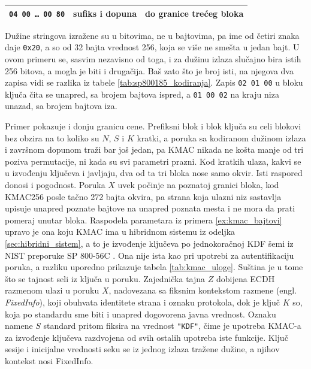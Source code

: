 \begin{example}
\begin{center}
\begin{tabular}{|l|l|l|}
\hline
\cellcolor{gray!30}\texttt{04 00 \dots\ 00 80} & sufiks i dopuna & do granice trećeg bloka \\
\hline
\end{tabular}
\end{center}
Dužine stringova izražene su u bitovima, ne u bajtovima, pa ime od četiri znaka daje \texttt{0x20}, a so od 32 bajta vrednost 256, koja se više ne smešta u jedan bajt. U ovom primeru se, sasvim nezavisno od toga, i za dužinu izlaza slučajno bira istih 256 bitova, a mogla je biti i drugačija. Baš zato što je broj isti, na njegova dva zapisa vidi se razlika iz tabele \ref{tab:sp800185_kodiranja}. Zapis \texttt{02 01 00} u bloku ključa čita se unapred, sa brojem bajtova ispred, a \texttt{01 00 02} na kraju niza unazad, sa brojem bajtova iza.
\end{example}

Primer pokazuje i donju granicu cene. Prefiksni blok i blok ključa su celi blokovi bez obzira na to koliko su $N$, $S$ i $K$ kratki, a poruka sa kodiranom dužinom izlaza i završnom dopunom traži bar još jedan, pa KMAC nikada ne košta manje od tri poziva permutacije, ni kada su svi parametri prazni. Kod kratkih ulaza, kakvi se u izvođenju ključeva i javljaju, dva od ta tri bloka nose samo okvir. Isti raspored donosi i pogodnost. Poruka $X$ uvek počinje na poznatoj granici bloka, kod KMAC256 posle tačno 272 bajta okvira, pa strana koja ulazni niz sastavlja upisuje unapred poznate bajtove na unapred poznata mesta i ne mora da prati pomeraj unutar bloka.
\smallbreak
Raspodela parametara iz primera \ref{ex:kmac_bajtovi} upravo je ona koju KMAC ima u hibridnom sistemu iz odeljka \ref{sec:hibridni_sistem}, a to je izvođenje ključeva po jednokoračnoj KDF šemi iz NIST preporuke SP 800-56C \cite{sp80056c}. Ona nije ista kao pri upotrebi za autentifikaciju poruka, a razliku uporedno prikazuje tabela \ref{tab:kmac_uloge}. Suština je u tome što se tajnost seli iz ključa u poruku. Zajednička tajna $Z$ dobijena ECDH razmenom ulazi u poruku $X$, nadovezana sa fiksnim kontekstom razmene (engl. \textit{FixedInfo}), koji obuhvata identitete strana i oznaku protokola, dok je ključ $K$ so, koja po standardu sme biti i unapred dogovorena javna vrednost. Oznaku namene $S$ standard pritom fiksira na vrednost \texttt{"KDF"}, čime je upotreba KMAC-a za izvođenje ključeva razdvojena od svih ostalih upotreba iste funkcije. Ključ sesije i inicijalne vrednosti seku se iz jednog izlaza tražene dužine, a njihov kontekst nosi FixedInfo.

